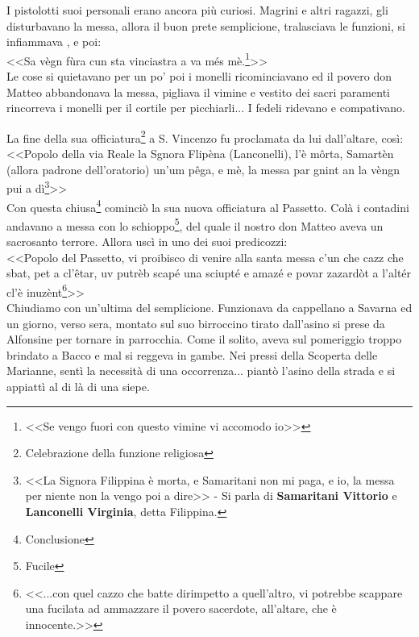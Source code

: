 I pistolotti suoi personali erano ancora più curiosi. Magrini e altri ragazzi, gli disturbavano la messa, allora il buon prete semplicione, tralasciava le funzioni, si infiammava , e poi:\\
\indent <<Sa vègn fùra cun sta vinciastra a va més mè.\footnote{<<Se vengo fuori con questo vimine vi accomodo io>>}>>\\
\indent Le cose si quietavano per un po' poi i monelli ricominciavano ed il povero don Matteo abbandonava la messa, pigliava il vimine e vestito dei sacri paramenti rincorreva i monelli per il cortile per picchiarli... I fedeli ridevano e compativano. 

La fine della sua officiatura\footnote{Celebrazione della funzione religiosa} a S. Vincenzo fu proclamata da lui dall'altare, così:\\
\indent <<Popolo della via Reale la Sgnora Flipèna (Lanconelli), l'è môrta, Samartèn (allora padrone dell'oratorio) un'um pêga, e mè, la messa par gnint an la vèngn pui a dì\footnote{<<La Signora Filippina è morta, e Samaritani non mi paga, e io, la messa per niente non la vengo poi a dire>> - Si parla di \textbf{Samaritani Vittorio} e \textbf{Lanconelli Virginia}, detta Filippina.}>>\\
Con questa chiusa\footnote{Conclusione} cominciò la sua nuova officiatura al Passetto. Colà i contadini andavano a messa con lo schioppo\footnote{Fucile}, del quale il nostro don Matteo aveva un sacrosanto terrore. Allora uscì in uno dei suoi predicozzi:\\
\indent <<Popolo del Passetto, vi proibisco di venire alla santa messa c'un che cazz che sbat, pet a cl'êtar, uv putrèb scapé una sciupté e amazé e povar zazardòt a l'altér cl'è inuzènt\footnote{<<...con quel cazzo che batte dirimpetto a quell'altro, vi potrebbe scappare una fucilata ad ammazzare il povero sacerdote, all'altare, che è innocente.>>}>>\\

Chiudiamo con un'ultima del semplicione. Funzionava da cappellano a Savarna ed un giorno, verso sera, montato sul suo birroccino tirato dall'asino si prese da Alfonsine per tornare in parrocchia. Come il solito, aveva sul pomeriggio troppo brindato a Bacco e mal si reggeva in gambe. Nei pressi della Scoperta delle Marianne, sentì la necessità di una occorrenza... piantò l'asino della strada e si appiattì al di là di una siepe.

